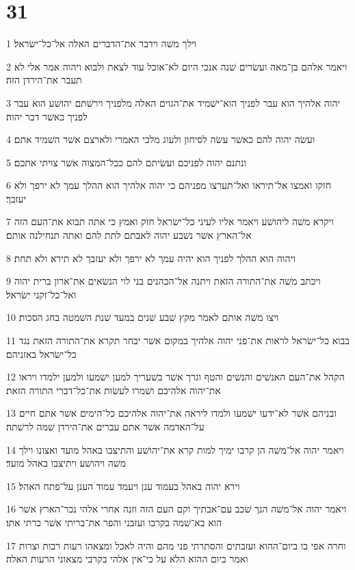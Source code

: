 \chapter{31}

\par 1 וילך משׁה וידבר את־הדברים האלה אל־כל־ישׂראל׃
\par 2 ויאמר אלהם בן־מאה ועשׂרים שׁנה אנכי היום לא־אוכל עוד לצאת ולבוא ויהוה אמר אלי לא תעבר את־הירדן הזה׃
\par 3 יהוה אלהיך הוא עבר לפניך הוא־ישׁמיד את־הגוים האלה מלפניך וירשׁתם יהושׁע הוא עבר לפניך כאשׁר דבר יהוה׃
\par 4 ועשׂה יהוה להם כאשׁר עשׂה לסיחון ולעוג מלכי האמרי ולארצם אשׁר השׁמיד אתם׃
\par 5 ונתנם יהוה לפניכם ועשׂיתם להם ככל־המצוה אשׁר צויתי אתכם׃
\par 6 חזקו ואמצו אל־תיראו ואל־תערצו מפניהם כי יהוה אלהיך הוא ההלך עמך לא ירפך ולא יעזבך׃
\par 7 ויקרא משׁה ליהושׁע ויאמר אליו לעיני כל־ישׂראל חזק ואמץ כי אתה תבוא את־העם הזה אל־הארץ אשׁר נשׁבע יהוה לאבתם לתת להם ואתה תנחילנה אותם׃
\par 8 ויהוה הוא ההלך לפניך הוא יהיה עמך לא ירפך ולא יעזבך לא תירא ולא תחת׃
\par 9 ויכתב משׁה את־התורה הזאת ויתנה אל־הכהנים בני לוי הנשׂאים את־ארון ברית יהוה ואל־כל־זקני ישׂראל׃
\par 10 ויצו משׁה אותם לאמר מקץ שׁבע שׁנים במעד שׁנת השׁמטה בחג הסכות׃
\par 11 בבוא כל־ישׂראל לראות את־פני יהוה אלהיך במקום אשׁר יבחר תקרא את־התורה הזאת נגד כל־ישׂראל באזניהם׃
\par 12 הקהל את־העם האנשׁים והנשׁים והטף וגרך אשׁר בשׁעריך למען ישׁמעו ולמען ילמדו ויראו את־יהוה אלהיכם ושׁמרו לעשׂות את־כל־דברי התורה הזאת׃
\par 13 ובניהם אשׁר לא־ידעו ישׁמעו ולמדו ליראה את־יהוה אלהיכם כל־הימים אשׁר אתם חיים על־האדמה אשׁר אתם עברים את־הירדן שׁמה לרשׁתה׃
\par 14 ויאמר יהוה אל־משׁה הן קרבו ימיך למות קרא את־יהושׁע והתיצבו באהל מועד ואצונו וילך משׁה ויהושׁע ויתיצבו באהל מועד׃
\par 15 וירא יהוה באהל בעמוד ענן ויעמד עמוד הענן על־פתח האהל׃
\par 16 ויאמר יהוה אל־משׁה הנך שׁכב עם־אבתיך וקם העם הזה וזנה אחרי אלהי נכר־הארץ אשׁר הוא בא־שׁמה בקרבו ועזבני והפר את־בריתי אשׁר כרתי אתו׃
\par 17 וחרה אפי בו ביום־ההוא ועזבתים והסתרתי פני מהם והיה לאכל ומצאהו רעות רבות וצרות ואמר ביום ההוא הלא על כי־אין אלהי בקרבי מצאוני הרעות האלה׃
